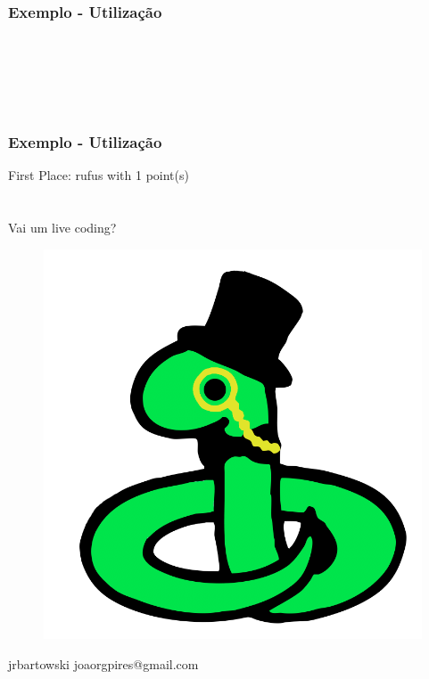 \documentclass{beamer}
\begin{document}
	\begin{frame}[fragile]
		\frametitle{Exemplo - Utilização}
		\inputminted[breaklines, firstline=136, lastline=136]{python}{classExample.py} \pause
		\inputminted[breaklines, firstline=139, lastline=139]{python}{classExample.py} \pause
		\inputminted[breaklines, firstline=140, lastline=140]{python}{classExample.py} \pause
		\inputminted[breaklines, firstline=144, lastline=144]{python}{classExample.py} \pause
		\inputminted[breaklines, firstline=145, lastline=145]{python}{classExample.py} \pause
		\inputminted[breaklines, firstline=150, lastline=150]{python}{classExample.py} \pause
		\inputminted[breaklines, firstline=151, lastline=151]{python}{classExample.py}
	\end{frame}
	
	\begin{frame}[fragile]
		\frametitle{Exemplo - Utilização}
		 \pause
		First Place:  rufus with 1 point(s)
	\end{frame}
	
	\section*{}
	\begin{frame}
		\begin{center}
			Vai um live coding?
			\begin{figure}
				\includegraphics[scale=0.17]{images/sir}
			\end{figure}
			{\faGithub} jrbartowski \hspace{1cm} {\faEnvelope} joaorgpires@gmail.com
		\end{center}
	\end{frame}
\end{document}
